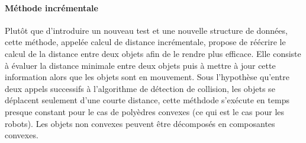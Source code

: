 \documentclass{article}
\begin{document}
\paragraph{Méthode incrémentale}
Plutôt que d'introduire un nouveau test et une nouvelle structure de données, cette méthode, appelée calcul de distance incrémentale, propose de réécrire le calcul de la distance entre deux objets afin de le rendre plus efficace. Elle consiste à évaluer la distance minimale entre deux objets puis à mettre à jour cette information alors que les objets sont en mouvement. Sous l'hypothèse qu’entre deux appels successifs à l’algorithme de détection de collision, les objets se déplacent seulement d'une courte distance, cette méthdode s'exécute en temps presque constant pour le cas de polyèdres convexes (ce qui est le cas pour les robots). Les objets non convexes peuvent être décomposés en composantes convexes.
\end{document}
